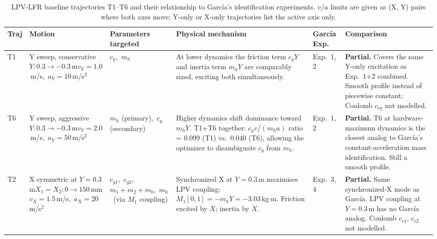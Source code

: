 \documentclass[a4paper, 11pt]{article}
\begin{document}
\begin{table}[htbp]
\centering
\caption{LPV-LFR baseline trajectories T1--T6 and their relationship to
Garc\'{i}a's identification experiments.
$v$/$a$ limits are given as (X, Y) pairs where both axes move; Y-only or X-only
trajectories list the active axis only.}
\label{tab:trajectories}
\small
\renewcommand{\arraystretch}{1.6}
\begin{tabular}{C{0.5cm} L{2.8cm} L{3.0cm} L{3.0cm} C{1.1cm} L{3.5cm}}
\toprule
\textbf{Traj} & \textbf{Motion} & \textbf{Parameters targeted} & \textbf{Physical mechanism} & \textbf{García Exp.} & \textbf{Comparison} \\
\midrule

T1 &
Y sweep, conservative\newline $Y: 0.3\to-0.3$\,m\newline $v_Y=1.0$\,m/s,\ $a_Y=10$\,m/s$^2$ &
$c_y$,\ $m_h$ &
At lower dynamics the friction term $c_y\dot{Y}$ and inertia term $m_h\ddot{Y}$
are comparably sized, exciting both simultaneously. &
Exp.~1, 2 &
\textbf{Partial.} Covers the same Y-only excitation as Exp.~1+2 combined.
Smooth profile instead of piecewise constant; Coulomb $c_{cy}$ not modelled. \\

\midrule

T6 &
Y sweep, aggressive\newline $Y: 0.3\to-0.3$\,m\newline $v_Y=2.0$\,m/s,\ $a_Y=50$\,m/s$^2$ &
$m_h$ (primary),\ $c_y$ (secondary) &
Higher dynamics shift dominance toward $m_h\ddot{Y}$.
T1+T6 together: $c_y v/(m_h a)$ ratio = 0.099 (T1) vs.\ 0.040 (T6),
allowing the optimizer to disambiguate $c_y$ from $m_h$. &
Exp.~1, 2 &
\textbf{Partial.} T6 at hardware-maximum dynamics is the closest analog to
Garc\'{i}a's constant-acceleration mass identification. Still a smooth profile. \\

\midrule

T2 &
X symmetric at $Y=0.3$\,m\newline $X_1{=}X_2: 0\to150$\,mm\newline $v_X=1.5$\,m/s,\ $a_X=20$\,m/s$^2$ &
$c_{g1}$,\ $c_{g2}$,\ $m_1{+}m_2{+}m_b$,\ $m_h$\ (via $M_1$ coupling) &
Synchronized X at $Y=0.3$\,m maximises LPV coupling:
$M_1[0,1] = -m_h Y = -3.03$\,kg$\cdot$m.
Friction excited by $\dot{X}$; inertia by $\ddot{X}$. &
Exp.~3, 4 &
\textbf{Partial.} Same synchronized-X mode as Garc\'{i}a. LPV coupling at $Y=0.3$\,m
has no Garc\'{i}a analog. Coulomb $c_{c1}$, $c_{c2}$ not modelled. \\


\end{tabular}
\end{table}
\end{document}
